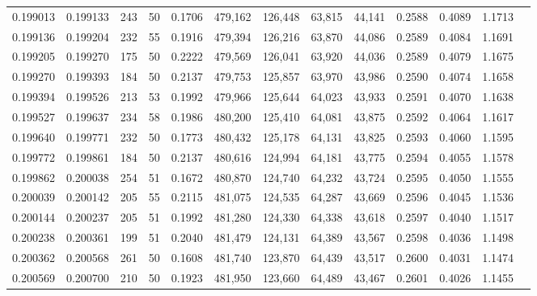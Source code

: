 \begin{tabular}{rrrrrrrrrrrrr}
0.199013 & 0.199133 &   243 &  50 &                                     0.1706 & 479,162 & 126,448 &  63,815 &  44,141 & 0.2588 & 0.4089 & 1.1713 \\
0.199136 & 0.199204 &   232 &  55 &                                     0.1916 & 479,394 & 126,216 &  63,870 &  44,086 & 0.2589 & 0.4084 & 1.1691 \\
0.199205 & 0.199270 &   175 &  50 &                                     0.2222 & 479,569 & 126,041 &  63,920 &  44,036 & 0.2589 & 0.4079 & 1.1675 \\
0.199270 & 0.199393 &   184 &  50 &                                     0.2137 & 479,753 & 125,857 &  63,970 &  43,986 & 0.2590 & 0.4074 & 1.1658 \\
0.199394 & 0.199526 &   213 &  53 &                                     0.1992 & 479,966 & 125,644 &  64,023 &  43,933 & 0.2591 & 0.4070 & 1.1638 \\
0.199527 & 0.199637 &   234 &  58 &                                     0.1986 & 480,200 & 125,410 &  64,081 &  43,875 & 0.2592 & 0.4064 & 1.1617 \\
0.199640 & 0.199771 &   232 &  50 &                                     0.1773 & 480,432 & 125,178 &  64,131 &  43,825 & 0.2593 & 0.4060 & 1.1595 \\
0.199772 & 0.199861 &   184 &  50 &                                     0.2137 & 480,616 & 124,994 &  64,181 &  43,775 & 0.2594 & 0.4055 & 1.1578 \\
0.199862 & 0.200038 &   254 &  51 &                                     0.1672 & 480,870 & 124,740 &  64,232 &  43,724 & 0.2595 & 0.4050 & 1.1555 \\
0.200039 & 0.200142 &   205 &  55 &                                     0.2115 & 481,075 & 124,535 &  64,287 &  43,669 & 0.2596 & 0.4045 & 1.1536 \\
0.200144 & 0.200237 &   205 &  51 &                                     0.1992 & 481,280 & 124,330 &  64,338 &  43,618 & 0.2597 & 0.4040 & 1.1517 \\
0.200238 & 0.200361 &   199 &  51 &                                     0.2040 & 481,479 & 124,131 &  64,389 &  43,567 & 0.2598 & 0.4036 & 1.1498 \\
0.200362 & 0.200568 &   261 &  50 &                                     0.1608 & 481,740 & 123,870 &  64,439 &  43,517 & 0.2600 & 0.4031 & 1.1474 \\
0.200569 & 0.200700 &   210 &  50 &                                     0.1923 & 481,950 & 123,660 &  64,489 &  43,467 & 0.2601 & 0.4026 & 1.1455 \\

\end{tabular}
